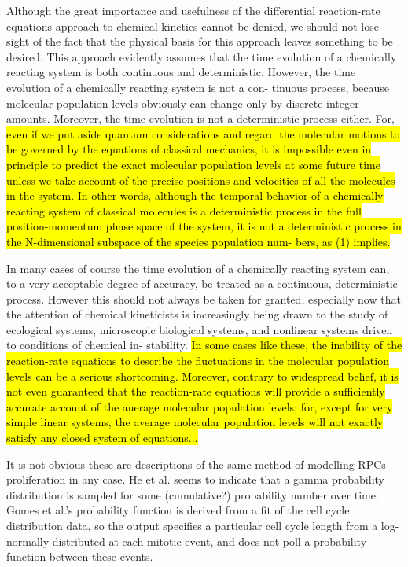\begin{longquote}Although the great importance and usefulness of the
differential reaction-rate equations approach to chemical
kinetics cannot be denied, we should not lose sight of the
fact that the physical basis for this approach leaves
something to be desired. This approach evidently assumes
that the time evolution of a chemically reacting system is
both continuous and deterministic. However, the time
evolution of a chemically reacting system is not a con-
tinuous process, because molecular population levels
obviously can change only by discrete integer amounts.
Moreover, the time evolution is not a deterministic process
either. For, \hl{even if we put aside quantum considerations
and regard the molecular motions to be governed by the
equations of classical mechanics, it is impossible even in
principle to predict the exact molecular population levels
at some future time unless we take account of the precise
positions and velocities of all the molecules in the system.
In other words, although the temporal behavior of a
chemically reacting system of classical molecules is a
deterministic process in the full position-momentum phase
space of the system, it is not a deterministic process in the
N-dimensional subspace of the species population num-
bers, as (1) implies.}

In many cases of course the time evolution of a
chemically reacting system can, to a very acceptable degree
of accuracy, be treated as a continuous, deterministic
process. However this should not always be taken for
granted, especially now that the attention of chemical
kineticists is increasingly being drawn to the study of
ecological systems, microscopic biological systems, and
nonlinear systems driven to conditions of chemical in-
stability. \hl{In some cases like these, the inability of the
reaction-rate equations to describe the fluctuations in the
molecular population levels can be a serious shortcoming.
Moreover, contrary to widespread belief, it is not even
guaranteed that the reaction-rate equations will provide
a sufficiently accurate account of the auerage molecular
population levels; for, except for very simple linear systems,
the average molecular population levels will not exactly
satisfy any closed system of equations...}
\end{longquote}

\bigskip


It is not obvious these are descriptions of the same method of modelling RPCs proliferation in any case. He et al. seems to indicate that a gamma probability distribution is sampled for some (cumulative?) probability number over time. Gomes et al.'s probability function is derived from a fit of the cell cycle distribution data, so the output specifies a particular cell cycle length from a log-normally distributed at each mitotic event, and does not poll a probability function between these events.

